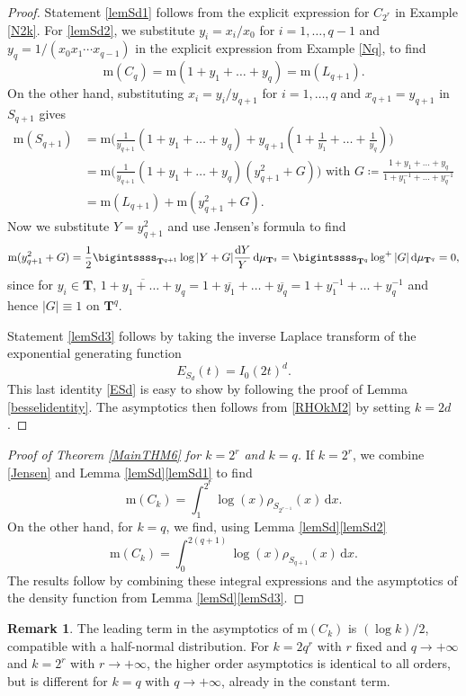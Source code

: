 \documentclass[12pt,reqno]{amsart}
\theoremstyle{definition}
\theoremstyle{plain}
\theoremstyle{definition}
\newtheorem{remark}[theorem]{Remark}
\newcommand{\T}{\mathbf{T}}
\newcommand\m{\mathrm{m}}
\renewcommand{\d}{\mathrm{d}}
\begin{document}
\begin{proof} 
Statement \eqref{lemSd1} follows from the explicit expression for $C_{2^r}$ in Example \ref{N2k}. For \eqref{lemSd2}, we substitute   $y_i =  x_i/x_0$ for $i=1,\dots,q-1$ and $y_q = 1/(x_0 x_1 \cdots x_{q-1})$ in the explicit expression from Example \ref{Nq}, to find 
$$ \m(C_q) = \m(1+y_1+\dots+y_q) = \m(L_{q+1}). $$
On the other hand, substituting $x_i=y_i/y_{q+1}$ for $i=1,\dots,q$ and $x_{q+1}=y_{q+1}$ in $S_{q+1}$ gives 
\begin{align*} \m(S_{q+1}) & = \m\Big( \frac{1}{y_{q+1}}(1+y_1+\dots+y_q) + y_{q+1}(1+\frac{1}{y_1}+\dots+\frac{1}{y_q})\Big) \\ 
& = \m\Big( \frac{1}{y_{q+1}}(1+y_1+\dots+y_q)(y^2_{q+1} + G)\Big) \mbox{ with } G\coloneqq  \frac{1+y_1+\dots+y_q}{1+y_1^{-1}+\dots+y_q^{-1}} \\ 
& = \m(L_{q+1}) + \m(y_{q+1}^2 + G). 
\end{align*}
Now we substitute $Y=y_{q+1}^2$ and use Jensen's formula to find 
$$ \m(y_{q+1}^2 + G) = \frac{1}{2} \bigintssss_{\T^{q+1}} \log |Y + G| \frac{\d Y}{Y} \, \d \mu_{\T^q} = \bigintssss_{\T^q} \log^+ |G| \, \d\mu_{\T^q} = 0, $$
since for $y_i \in \T$, $\overline{1+y_1+\dots+y_q} =1+\overline{y_1}+\dots+\overline{y_q} = 1+y^{-1}_1+\dots+y^{-1}_q$
and hence $|G| \equiv 1$ on $\T^q$. 

Statement \eqref{lemSd3} follows by taking the inverse Laplace transform of the exponential generating function \begin{equation} \label{ESd} E_{S_d}(t) = I_0(2t)^d. \end{equation} This last identity \eqref{ESd} is easy to show by following the proof of Lemma \ref{besselidentity}. The asymptotics then follows from  \eqref{RHOkM2} by setting $k=2d$. 
\end{proof} 

\begin{proof}[Proof of Theorem \ref{MainTHM6} for $k=2^r$ and $k=q$]
If $k = 2^r$, we combine \eqref{Jensen} and Lemma \ref{lemSd}\eqref{lemSd1} to find 
\[
\m(C_k) = \int_1^{2^r} \log(x) \rho_{S_{2^{r-1}}}(x) \, \d x.
\]
On the other hand, for $k = q$, we find, using Lemma \ref{lemSd}\eqref{lemSd2} 
\[
\m(C_k) = \int_0^{2(q+1)} \log(x) \rho_{S_{q+1}}(x) \, \d x.
\]
The results follow by combining these integral expressions and the asymptotics of the density function from Lemma \ref{lemSd}\eqref{lemSd3}. \end{proof}

\begin{remark}
The leading term in the asymptotics of $\m(C_k)$ is $(\log k)/2$, compatible with a half-normal distribution. For $k=2q^r$ with $r$ fixed and $q \rightarrow + \infty$ and $k=2^r$ with $r \rightarrow + \infty$, the higher order asymptotics is identical to all orders, but is different for $k=q$ with $q \rightarrow +\infty$, already in the constant term. 
\end{remark} 
\end{document}
